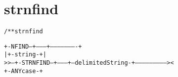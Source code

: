 \section{strnfind}
\begin{shaded}
\begin{alltt}
/** strnfind

       +-NFIND--+--------+----------------------+
       |        +-string-+                      |
   >>--+-STRNFIND--+---------+--delimitedString-+--------------------------><
                   +-ANYcase-+

\end{alltt}
\end{shaded}
